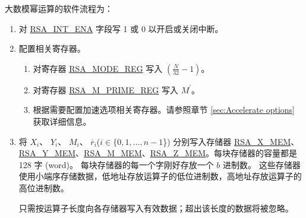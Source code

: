 \documentclass[main\_\_CN.tex]{subfiles}
\begin{document}
大数模幂运算的软件流程为：

\begin{enumerate}

    \item 对 \hyperref[fielddesc:RSAINTENA]{RSA\_INT\_ENA} 字段写 1 或 0 以开启或关闭中断。

    \item 配置相关寄存器。

    \begin{enumerate}
        \item 对寄存器 \hyperref[regdesc:RSAMODEREG]{RSA\_MODE\_REG} 写入 \begin{math}( \frac{N}{32} - 1 )\end{math}。

        \item 对寄存器 \hyperref[regdesc:RSAMPRIMEREG]{RSA\_M\_PRIME\_REG} 写入 \begin{math}M^{\prime}\end{math}。

        \item 根据需要配置加速选项相关寄存器。请参照章节 \ref{sec:Accelerate options} 获取详细信息。
    \end{enumerate}

    \item 将
        \begin{math}X_{i}\end{math}、
        \begin{math}Y_{i}\end{math}、
        \begin{math}M_{i}\end{math}、
        \begin{math}\overline{r}_{i}\end{math}(\begin{math}i \in \{ 0, 1, \dots, n-1 \end{math}\})
        分别写入存储器 \hyperref[regdesc:RSAmemory]{RSA\_X\_MEM}、\hyperref[regdesc:RSAmemory]{RSA\_Y\_MEM}、\hyperref[regdesc:RSAmemory]{RSA\_M\_MEM}、\hyperref[regdesc:RSAmemory]{RSA\_Z\_MEM}。每块存储器的容量都是 128 字 (word)。
        每块存储器的每一个字刚好存放一个
        \begin{math}b\end{math} 进制数。
        这些存储器使用小端序存储数据，低地址存放运算子的低位进制数，高地址存放运算子的高位进制数。

        只需按运算子长度向各存储器写入有效数据；超出该长度的数据将被忽略。


\end{enumerate}
\end{document}
